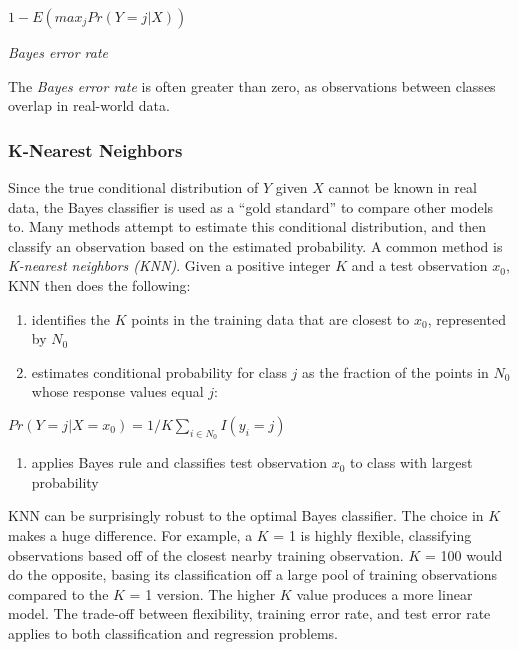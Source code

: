 \documentclass[]{book}
\providecommand{\tightlist}{%
  \setlength{\itemsep}{0pt}\setlength{\parskip}{0pt}}
\begin{document}
\(1-E(max_jPr(Y = j|X))\)

\emph{Bayes error rate}

The \emph{Bayes error rate} is often greater than zero, as observations between classes overlap in real-world data.

\hypertarget{k-nearest-neighbors}{%
\subsubsection{K-Nearest Neighbors}\label{k-nearest-neighbors}}

Since the true conditional distribution of \(Y\) given \(X\) cannot be known in real data, the Bayes classifier is used as a ``gold standard'' to compare other models to. Many methods attempt to estimate this conditional distribution, and then classify an observation based on the estimated probability. A common method is \emph{K-nearest neighbors (KNN)}. Given a positive integer \(K\) and a test observation \(x_0\), KNN then does the following:

\begin{enumerate}
\def\labelenumi{\arabic{enumi}.}
\tightlist
\item
  identifies the \(K\) points in the training data that are closest to \(x_0\), represented by \(N_0\)
\item
  estimates conditional probability for class \(j\) as the fraction of the points in \(N_0\) whose response values equal \(j\):
\end{enumerate}

\(Pr(Y = j| X = x_0) = 1/K\sum_{i\in N_0}I(y_i = j)\)

\begin{enumerate}
\def\labelenumi{\arabic{enumi}.}
\setcounter{enumi}{2}
\tightlist
\item
  applies Bayes rule and classifies test observation \(x_0\) to class with largest probability
\end{enumerate}

KNN can be surprisingly robust to the optimal Bayes classifier. The choice in \(K\) makes a huge difference. For example, a \(K\) = 1 is highly flexible, classifying observations based off of the closest nearby training observation. \(K\) = 100 would do the opposite, basing its classification off a large pool of training observations compared to the \(K\) = 1 version. The higher \(K\) value produces a more linear model. The trade-off between flexibility, training error rate, and test error rate applies to both classification and regression problems.
\end{document}

